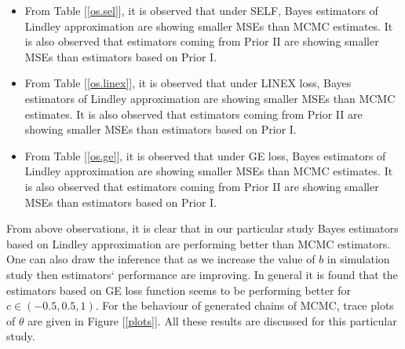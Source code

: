 \documentclass[11pt,a4paper]{article}
\numberwithin{equation}{section}
\begin{document}
	\begin{itemize}

		\item From Table [\ref{os.sel}], it is observed that under SELF, Bayes estimators of Lindley approximation are showing smaller MSEs than MCMC estimates. It is also observed that estimators coming from Prior II are showing smaller MSEs than estimators based on Prior I.

		\item From Table [\ref{os.linex}], it is observed that under LINEX loss, Bayes estimators of Lindley approximation are showing smaller MSEs than MCMC estimates. It is also observed that estimators coming from Prior II are showing smaller MSEs than estimators based on Prior I.

		\item From Table [\ref{os.ge}], it is observed that under GE loss, Bayes estimators of Lindley approximation are showing smaller MSEs than MCMC estimates. It is also observed that estimators coming from Prior II are showing smaller MSEs than estimators based on Prior I.

	\end{itemize}

	From above observations, it is clear that in our particular study Bayes estimators based on Lindley approximation are performing better than MCMC estimators. One can also draw the inference that as we increase the value of $b$ in simulation study then estimators` performance are improving. In general it is found that the estimators based on GE loss function seems to be performing better for $c\in (-0.5,0.5,1)$. For the behaviour of generated chains of MCMC, trace plots of $\theta$ are given in Figure [\ref{plots}]. All these results are discussed for this particular study.  

	

	

\end{document}
